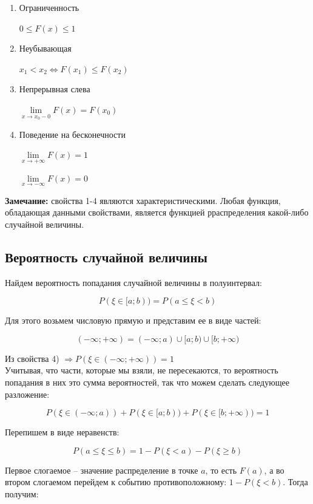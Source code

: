 \documentclass{article}
\begin{document}
\begin{enumerate}
\item Ограниченность

\qquad$0 \leq F(x) \leq 1$

\item Неубывающая

\qquad$x_1 < x_2 \Leftrightarrow F(x_1) \leq F(x_2)$

\item Непрерывная слева

\qquad$\lim\limits_{x \rightarrow x_0 - 0} F(x) = F(x_0)$

\item Поведение на бесконечности

\qquad$ \lim\limits_{x \rightarrow +\infty} F(x) = 1$

\qquad$ \lim\limits_{x \rightarrow -\infty} F(x) = 0$

\end{enumerate}


\textbf{Замечание:} свойства 1-4 являются характеристическими. Любая функция, обладающая данными свойствами, является функцией рраспределения какой-либо случайной величины.

\subsection{Вероятность случайной величины}

Найдем вероятность попадания случайной величины в полуинтервал:

$$P(\xi \in [a; b)) = P(a \leq \xi < b)$$


Для этого возьмем числовую прямую и представим ее в виде частей:

$$(-\infty; +\infty) = (-\infty; a)\cup[a; b)\cup[b; +\infty)$$

Из свойства 4) $\Rightarrow P(\xi \in (-\infty; +\infty)) = 1$
\\

Учитывая, что части, которые мы взяли, не пересекаются, то вероятность попадания в них это сумма вероятностей, так что можем сделать следующее разложение:

$$P(\xi \in (-\infty; a)) + P(\xi \in [a; b)) + P(\xi \in [b; +\infty)) = 1$$

Перепишем в виде неравенств:

$$ P(a \leq \xi \leq b) = 1 - P(\xi < a) - P(\xi \geq b)$$

Первое слогаемое -- значение распределение в точке $a$, то есть $F(a)$, а во втором слогаемом перейдем к событию противоположному: $1 - P(\xi < b)$. Тогда получим:
\end{document}
